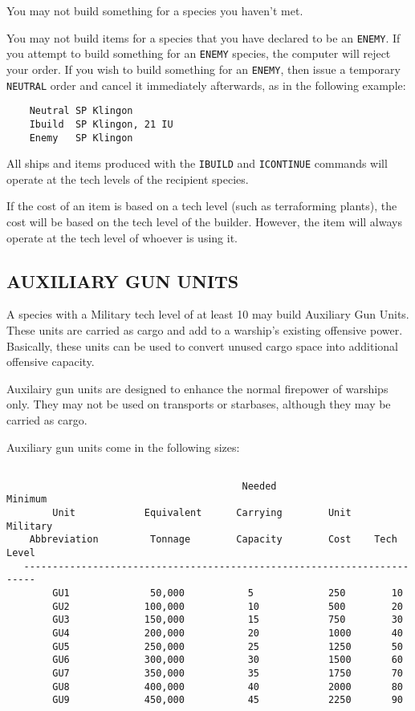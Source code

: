 \documentclass[10pt,titlepage]{article}
\begin{document}
You may not build something for a species you haven't met.

You may not build items for a species that you have declared to be an \texttt{ENEMY}.
If you attempt to build something for an \texttt{ENEMY} species, the computer will
reject your order.  If you wish to build something for an \texttt{ENEMY}, then issue
a temporary \texttt{NEUTRAL} order and cancel it immediately afterwards, as in the
following example:

\begin{verbatim}
	Neutral	SP Klingon
	Ibuild	SP Klingon, 21 IU
	Enemy	SP Klingon\end{verbatim} 

All ships and items produced with the \texttt{IBUILD} and \texttt{ICONTINUE} commands will
operate at the tech levels of the recipient species.

If the cost of an item is based on a tech level (such as terraforming plants),
the cost will be based on the tech level of the builder.  However, the item
will always operate at the tech level of whoever is using it.


\subsection{AUXILIARY GUN UNITS}

A species with a Military tech level of at least 10 may build Auxiliary Gun
Units.  These units are carried as cargo and add to a warship's existing
offensive power.  Basically, these units can be used to convert unused cargo
space into additional offensive capacity.

Auxilairy gun units are designed to enhance the normal firepower of warships
only.  They may not be used on transports or starbases, although they may be
carried as cargo.

Auxiliary gun units come in the following sizes:

\begin{verbatim}

                                         Needed                  Minimum
        Unit            Equivalent      Carrying        Unit     Military
    Abbreviation         Tonnage        Capacity        Cost    Tech Level
   ------------------------------------------------------------------------
        GU1              50,000           5             250        10
        GU2             100,000           10            500        20
        GU3             150,000           15            750        30
        GU4             200,000           20            1000       40
        GU5             250,000           25            1250       50
        GU6             300,000           30            1500       60
        GU7             350,000           35            1750       70
        GU8             400,000           40            2000       80
        GU9             450,000           45            2250       90
\end{verbatim} 
\end{document}
